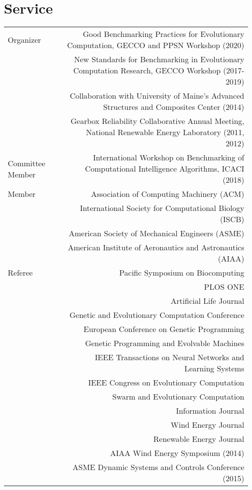 \section*{Service}
\begin{tabular}{L!{\VRule}R}
    Organizer 
        & Good Benchmarking Practices for Evolutionary Computation, GECCO and PPSN Workshop (2020) \\
        & New Standards for Benchmarking in Evolutionary Computation Research, GECCO Workshop (2017-2019) \\
        & Collaboration with University of Maine's Advanced Structures and Composites Center (2014) \\
        & Gearbox Reliability Collaborative Annual Meeting, National Renewable Energy Laboratory (2011, 2012) \\
    Committee Member 
        & International Workshop on Benchmarking of Computational Intelligence Algorithms, ICACI (2018) \\
    Member 
        & Association of Computing Machinery (ACM) \\
        & International Society for Computational Biology (ISCB) \\
        & American Society of Mechanical Engineers (ASME) \\
        & American Institute of Aeronautics and Astronautics (AIAA) \\
    Referee 
        & Pacific Symposium on Biocomputing\\
        & PLOS ONE \\
        & Artificial Life Journal \\
        & Genetic and Evolutionary Computation Conference \\
        & European Conference on Genetic Programming \\
        & Genetic Programming and Evolvable Machines \\
        & IEEE Transactions on Neural Networks and Learning Systems\\
        & IEEE Congress on Evolutionary Computation \\
        & Swarm and Evolutionary Computation \\
        & Information Journal \\
        & Wind Energy Journal \\
        & Renewable Energy Journal \\
        & AIAA Wind Energy Symposium (2014) \\
        & ASME Dynamic Systems and Controls Conference (2015) \\
\end{tabular}

